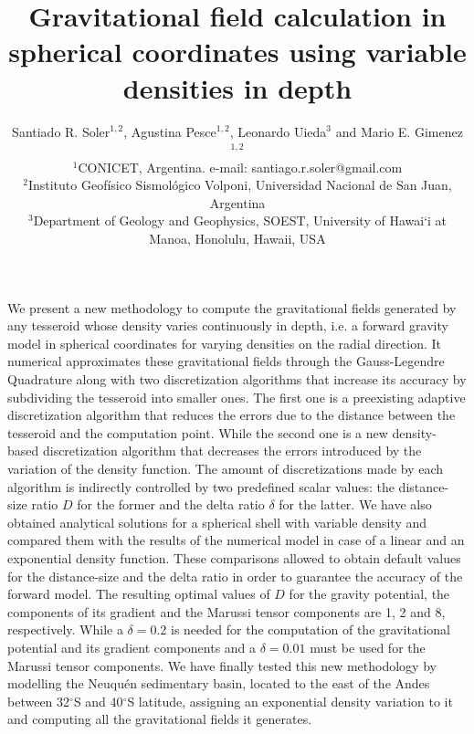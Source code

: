 \documentclass[extra]{gji}
\begin{document}
\title[Variable Density Tesseroids]{
    Gravitational field calculation in spherical coordinates using variable 
    densities in depth
}
\author[S.R. Soler, A. Pesce, L. Uieda and M.E. Gimenez]{
    Santiado R. Soler$^{1,2}$, Agustina Pesce$^{1,2}$, Leonardo Uieda$^3$ and
    Mario E. Gimenez$^{1,2}$ \\
    $^1$CONICET, Argentina. e-mail: santiago.r.soler@gmail.com\\
    $^2$Instituto Geofísico Sismológico Volponi, Universidad Nacional de
    San Juan, Argentina\\
    $^3$Department of Geology and Geophysics, SOEST, University of Hawai‘i at
    Manoa, Honolulu, Hawaii, USA
    }


\maketitle

\begin{summary}
We present a new methodology to compute the gravitational fields generated by 
any tesseroid whose density varies continuously in depth, i.e. a forward 
gravity model in spherical coordinates for varying densities on the radial 
direction.
It numerical approximates these gravitational fields through the 
Gauss-Legendre Quadrature along with two discretization algorithms that 
increase its accuracy by subdividing the tesseroid into smaller ones.
The first one is a preexisting adaptive discretization algorithm that reduces 
the errors due to the distance between the tesseroid and the computation 
point.
While the second one  is a new density-based discretization algorithm that 
decreases the errors introduced by the variation of the density function.
The amount of discretizations made by each algorithm is indirectly controlled 
by two predefined scalar values: the distance-size ratio $D$ for the former 
and the delta ratio $\delta$ for the latter.
We have also obtained analytical solutions for a spherical shell with variable 
density and compared them with the results of the numerical model in case of a 
linear and an exponential density function.
These comparisons allowed to obtain default values for the distance-size and 
the delta ratio in order to guarantee the accuracy of the forward model.
The resulting optimal values of $D$ for the gravity potential, the components 
of its gradient and the Marussi tensor components are 1, 2 and 8, 
respectively.
While a $\delta=0.2$ is needed for the computation of the gravitational 
potential and its gradient components and a $\delta=0.01$ must be used for 
the Marussi tensor components.
We have finally tested this new methodology by modelling the Neuqu\'en 
sedimentary basin, located to the east of the Andes between 32$^\circ$S and 
40$^\circ$S latitude, assigning an exponential density variation to it and 
computing all the gravitational fields it generates.
\end{summary}
\end{document}
